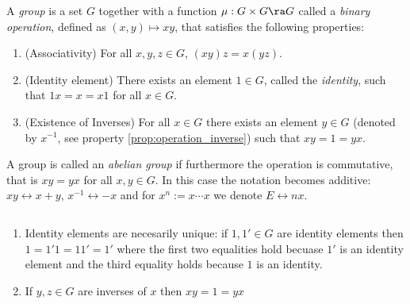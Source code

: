 \begin{defin}
  A \emph{group} is a set $G$ together with a function $\mu:G\times G\ra G$ called a
  \emph{binary operation}, defined as $(x,y)\mapsto xy$, that satisfies the following properties:
  \begin{enumerate}
  \item (Associativity) For all $x,y,z\in G$, $(xy)z=x(yz)$.
  \item (Identity element) There exists an element $1\in G$, called the \emph{identity}, such
    that $1x=x=x1$ for all $x\in G$.
  \item (Existence of Inverses) For all $x\in G$ there exists an element $y\in G$ (denoted
    by $x^{-1}$, see property \ref{prop:operation_inverse})
    such that $xy=1=yx$.
  \end{enumerate}
  A group is called an \emph{abelian group} if furthermore the operation is commutative, that
  is $xy=yx$ for all $x,y\in G$. In this case the notation becomes additive:
  $xy\leftrightarrow x+y$, $x^{-1}\leftrightarrow -x$ and for $x^n:=x\cdots x$ we denote
  $E \leftrightarrow nx$.
\end{defin}

\begin{properties}$\;$\\
  \begin{enumerate}
  \item Identity elements are necesarily unique: if $1,1'\in G$ are identity elements then
    $1=1'1=11'=1'$ where the first two equalities hold becuase $1'$ is an identity element
    and the third equality holds because $1$ is an identity.
    \item \label{prop:operation_inverse} If $y,z\in G$ are inverses of $x$ then $xy=1=yx$
  \end{enumerate}
\end{properties}